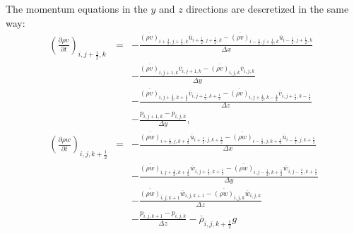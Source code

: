 The momentum equations in the $y$ and $z$ directions are descretized
in the same way:
\begin{eqnarray}
\left(\frac{\partial \rho v}{\partial t}\right)_{i,j+\frac{1}{2},k}
&=& - \frac{\overline{(\rho v)}_{i+\frac{1}{2},j+\frac{1}{2},k}  \overline{u}_{i+\frac{1}{2},j+\frac{1}{2},k}
           -\overline{(\rho v)}_{i-\frac{1}{2},j+\frac{1}{2},k}  \overline{u}_{i-\frac{1}{2},j+\frac{1}{2},k}}
     {\Delta x}\nonumber\\
& & - \frac{\overline{(\rho v)}_{i,j+1,k} \overline{v}_{i,j+1,k}
           -\overline{(\rho v)}_{i,j,k} \overline{v}_{i,j,k}}
     {\Delta y}\nonumber\\
& & - \frac{\overline{(\rho v)}_{i,j+\frac{1}{2},k+\frac{1}{2}}  \overline{v}_{i,j+\frac{1}{2},k+\frac{1}{2}}
           -\overline{(\rho v)}_{i,j+\frac{1}{2},k-\frac{1}{2}}  \overline{v}_{i,j+\frac{1}{2},k-\frac{1}{2}}}
     {\Delta z}\nonumber\\
& & -\frac{p_{i,j+1,k}-p_{i,j,k}}{\Delta y},\\
\left(\frac{\partial \rho w}{\partial t}\right)_{i,j,k+\frac{1}{2}}
&=& - \frac{\overline{(\rho w)}_{i+\frac{1}{2},j,k+\frac{1}{2}}  \overline{u}_{i+\frac{1}{2},j,k+\frac{1}{2}}
           -\overline{(\rho w)}_{i-\frac{1}{2},j,k+\frac{1}{2}}  \overline{u}_{i-\frac{1}{2},j,k+\frac{1}{2}}}
     {\Delta x}\nonumber\\
& & - \frac{\overline{(\rho w)}_{i,j+\frac{1}{2},k+\frac{1}{2}}  \overline{w}_{i,j+\frac{1}{2},k+\frac{1}{2}}
           -\overline{(\rho w)}_{i,j-\frac{1}{2},k+\frac{1}{2}}  \overline{w}_{i,j-\frac{1}{2},k+\frac{1}{2}}}
     {\Delta y}\nonumber\\
& & - \frac{\overline{(\rho w)}_{i,j,k+1} \overline{w}_{i,j,k+1}
           -\overline{(\rho w)}_{i,j,k} \overline{w}_{i,j,k}}
     {\Delta z}\nonumber\\
& & -\frac{p_{i,j,k+1}-p_{i,j,k}}{\Delta z}-\overline{\rho}_{i,j,k+\frac{1}{2}} g
\end{eqnarray}

